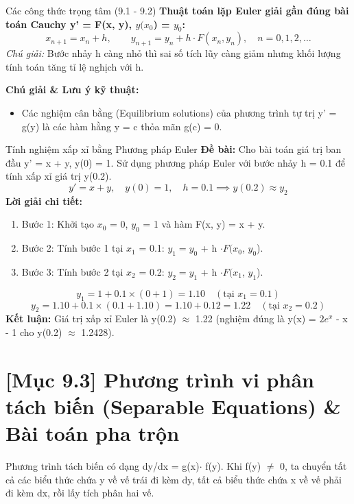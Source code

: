 \documentclass[11pt,a4paper,oneside]{book}
\begin{document}
\begin{congthuc}{Các công thức trọng tâm (9.1 - 9.2)}
\noindent\textbf{Thuật toán lặp Euler giải gần đúng bài toán Cauchy y' = F(x, y), $y(x_0$) = $y_0$:}
\[ x_{n+1} = x_n + h, \qquad y_{n+1} = y_n + h \cdot F(x_n, y_n), \quad n = 0, 1, 2, \dots \]
\noindent\textit{Chú giải:} Bước nhảy h càng nhỏ thì sai số tích lũy càng giảm nhưng khối lượng tính toán tăng tỉ lệ nghịch với h.\\[4pt]
\end{congthuc}

\noindent\textbf{Chú giải \& Lưu ý kỹ thuật:}
\begin{itemize}[leftmargin=1.5em, itemsep=2pt]
  \item Các nghiệm cân bằng (Equilibrium solutions) của phương trình tự trị y' = g(y) là các hàm hằng y = c thỏa mãn g(c) = 0.
\end{itemize}

\begin{vidu}{Tính nghiệm xấp xỉ bằng Phương pháp Euler}
\textbf{Đề bài:} Cho bài toán giá trị ban đầu y' = x + y, y(0) = 1. Sử dụng phương pháp Euler với bước nhảy h = 0.1 để tính xấp xỉ giá trị y(0.2).
\[ y' = x + y, \quad y(0) = 1, \quad h = 0.1 \implies y(0.2) \approx y_2 \]
\textbf{Lời giải chi tiết:}
\begin{enumerate}[leftmargin=1.5em, itemsep=2pt]
  \item Bước 1: Khởi tạo $x_0$ = 0, $y_0$ = 1 và hàm F(x, y) = x + y.
  \item Bước 2: Tính bước 1 tại $x_1$ = 0.1: $y_1 = y_0$ + h $\cdot F(x_0$, $y_0$).
  \item Bước 3: Tính bước 2 tại $x_2$ = 0.2: $y_2 = y_1$ + h $\cdot F(x_1$, $y_1$).
\end{enumerate}
\[ y_1 = 1 + 0.1 \times (0 + 1) = 1.10 \quad (\text{tại } x_1 = 0.1) \]
\[ y_2 = 1.10 + 0.1 \times (0.1 + 1.10) = 1.10 + 0.12 = 1.22 \quad (\text{tại } x_2 = 0.2) \]
\noindent\textbf{Kết luận:} Giá trị xấp xỉ Euler là y(0.2) $\approx$  1.22 (nghiệm đúng là y(x) = $2e^x$ - x - 1 cho y(0.2) $\approx$  1.2428).
\end{vidu}

\section{[Mục 9.3] Phương trình vi phân tách biến (Separable Equations) \& Bài toán pha trộn}
Phương trình tách biến có dạng dy/dx = g(x)$\cdot$ f(y). Khi f(y) $\neq$  0, ta chuyển tất cả các biểu thức chứa y về vế trái đi kèm dy, tất cả biểu thức chứa x về vế phải đi kèm dx, rồi lấy tích phân hai vế.
\end{document}
